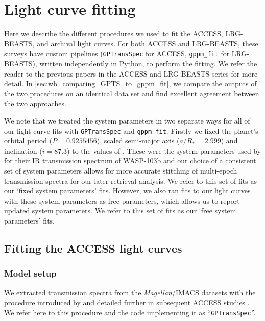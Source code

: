 \documentclass[twocolumn]{aastex63}
\newcommand{\gppmfit}{\texttt{gppm\_fit}}
\newcommand{\Magellan}{\textit{Magellan}}
\begin{document}
\section{Light curve fitting}
\label{sec:data_analysis}

Here we describe the different procedures we used to fit the ACCESS, LRG-BEASTS, and archival light curves. For both ACCESS and LRG-BEASTS, these surveys have custom pipelines (\texttt{GPTransSpec} for ACCESS, \gppmfit{} for LRG-BEASTS), written independently in Python, to perform the fitting. We refer the reader to the previous papers in the ACCESS and LRG-BEASTS series for more detail. In \autoref{sec:wb_comparing_GPTS_to_gppm_fit}, we compare the outputs of the two procedures on an identical data set and find excellent agreement between the two approaches.

We note that we treated the system parameters in two separate ways for all of our light curve fits with \texttt{GPTransSpec} and \gppmfit{}. Firstly we fixed the planet's orbital period ($P = 0.9255456$), scaled semi-major axis ($a/R_* = 2.999$) and inclination ($i = 87.3$) to the values of \cite{Southworth2015}. These were the system parameters used by \cite{Kreidberg2018} for their IR transmission spectrum of WASP-103b and our choice of a consistent set of system parameters allows for more accurate stitching of multi-epoch transmission spectra for our later retrieval analysis. We refer to this set of fits as our `fixed system parameters' fits. However, we also ran fits to our light curves with these system parameters as free parameters, which allows us to report updated system parameters. We refer to this set of fits as our `free system parameters' fits.

\subsection{Fitting the ACCESS light curves}
\label{sec:GPTransSpec}

\subsubsection{Model setup}

We extracted transmission spectra from the \Magellan{}/IMACS datasets with the procedure introduced by \citet{Espinoza2019} and detailed further in subsequent ACCESS studies \citep{Weaver2020,McGruder2020}.
We refer here to this procedure and the code implementing it as ``\texttt{GPTransSpec}''.
\end{document}
